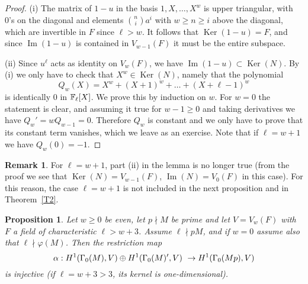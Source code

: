 \documentclass{amsart}
\theoremstyle{plain}
\newtheorem{proposition}[theorem]{Proposition}
\theoremstyle{definition}
\newtheorem{remark}[theorem]{Remark}
\numberwithin{equation}{section}
\def\im{\operatorname{Im}} \def\ker{\operatorname{Ker}} \def\stab{\operatorname{Stab }}
\def\a{\alpha}\def\b{\beta}\def\g{\gamma}
\def\vp{\varphi}
\begin{document}
\begin{proof}
(i) The matrix of $1-u$ in the basis $1,X, \ldots, X^w$ is upper triangular,
with 0's on the diagonal and elements $\binom{n}{i}a^i$ with 
$w\ge n \ge i$ above the diagonal, which are invertible in $F$ since $\ell>w$.
It follows that $\ker(1-u)=F$, and since $\im(1-u)$ 
is contained in $V_{w-1}(F)$ it must be the entire subspace. 

(ii) Since $u^{\ell}$ acts as identity on $V_w(F)$, we have 
$\im(1-u)\subset \ker(N)$. By (i) we only have to  
check that $X^w\in \ker(N)$, namely that the polynomial
$$Q_w(X)=X^w+(X+1)^w+\ldots+(X+\ell-1)^w$$   
is identically 0 in $\mathbb{F}_\ell[X]$. We prove this by induction on $w$. For $w=0$ the statement
is clear, and assuming it true for $w-1\ge 0$ and taking derivatives we have 
$Q_w'=wQ_{w-1}=0$. Therefore $Q_w$ is constant and we only have to prove that its constant
term vanishes, which we leave as an exercise. Note that if $\ell=w+1$ we have 
$Q_w(0)=-1$. 
\end{proof}
\begin{remark}\label{r4.5}
For $\ell=w+1$, part (ii) in the lemma is no longer true (from the proof we see that  
$\ker(N)=V_{w-1}(F)$, $\im(N)=V_0(F)$ in this case).  For this reason, the case $\ell=w+1$ is 
not included in the next proposition and in Theorem~\ref{T2}. 
\end{remark}
\begin{proposition} \label{P3} Let $w\ge 0$ be even, let $p\nmid M$ be prime and let
$V=V_w(F)$ with $F$ a field of characteristic $\ell>w+3$. Assume $\ell\nmid pM$, and if  
$w=0$ assume also that $\ell\nmid \vp(M)$.  Then the restriction map 
$$\a:H^1(\G_0(M), V)\oplus H^1(\G_0(M)', V)\ \rightarrow H^1(\G_0(Mp), V) $$ 
is injective (if $\ell= w+3>3$, its kernel is one-dimensional). 
\end{proposition}
\end{document}
